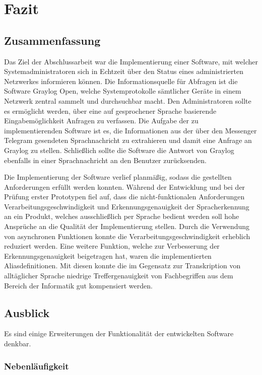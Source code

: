 \chapter{Fazit}
\label{cha:fazit}

\section{Zusammenfassung}

Das Ziel der Abschlussarbeit war die Implementierung einer Software, mit welcher Systemadministratoren sich in Echtzeit über den Status eines administrierten Netzwerkes informieren können. Die Informationsquelle für Abfragen ist die Software Graylog Open, welche Systemprotokolle sämtlicher Geräte in einem Netzwerk zentral sammelt und durchsuchbar macht. Den Administratoren sollte es ermöglicht werden, über eine auf gesprochener Sprache basierende Eingabemöglichkeit Anfragen zu verfassen. Die Aufgabe der zu implementierenden Software ist es, die Informationen aus der über den Messenger Telegram gesendeten Sprachnachricht zu extrahieren und damit eine Anfrage an Graylog zu stellen. Schließlich sollte die Software die Antwort von Graylog ebenfalls in einer Sprachnachricht an den Benutzer zurücksenden. 

Die Implementierung der Software verlief planmäßig, sodass die gestellten Anforderungen erfüllt werden konnten. Während der Entwicklung und bei der Prüfung erster Prototypen fiel auf, dass die nicht-funktionalen Anforderungen Verarbeitungsgeschwindigkeit und Erkennungsgenauigkeit der Spracherkennung an ein Produkt, welches ausschließlich per Sprache bedient werden soll hohe Ansprüche an die Qualität der Implementierung stellen. Durch die Verwendung von asynchronen Funktionen konnte die Verarbeitungsgeschwindigkeit erheblich reduziert werden. Eine weitere Funktion, welche zur Verbesserung der Erkennungsgenauigkeit beigetragen hat, waren die implementierten Aliasdefinitionen. Mit diesen konnte die im Gegensatz zur Transkription von alltäglicher Sprache niedrige Treffergenauigkeit von Fachbegriffen aus dem Bereich der Informatik gut kompensiert werden. 

\section{Ausblick}

Es sind einige Erweiterungen der Funktionalität der entwickelten Software denkbar. 

\subsection{Nebenläufigkeit}

